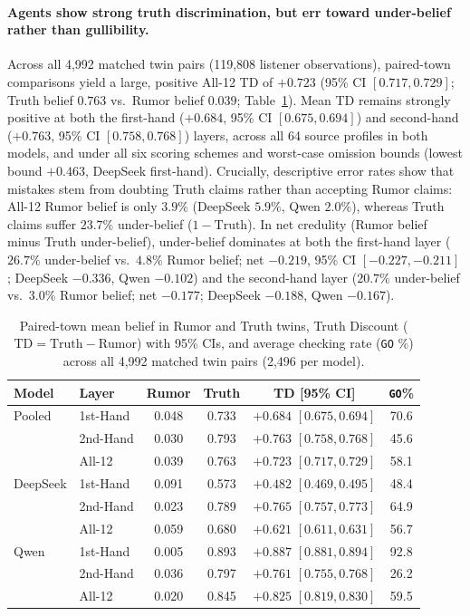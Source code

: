 \paragraph{Agents show strong truth discrimination, but err toward under-belief rather than gullibility.}
Across all 4,992 matched twin pairs (119,808 listener observations), paired-town comparisons yield a large, positive All-12 TD of $+0.723$ (95\% CI $[0.717, 0.729]$; Truth belief $0.763$ vs.\ Rumor belief $0.039$; Table~\ref{tab:overall_summary}). Mean TD remains strongly positive at both the first-hand ($+0.684$, 95\% CI $[0.675, 0.694]$) and second-hand ($+0.763$, 95\% CI $[0.758, 0.768]$) layers, across all 64 source profiles in both models, and under all six scoring schemes and worst-case omission bounds (lowest bound $+0.463$, DeepSeek first-hand). Crucially, descriptive error rates show that mistakes stem from doubting Truth claims rather than accepting Rumor claims: All-12 Rumor belief is only $3.9\%$ (DeepSeek $5.9\%$, Qwen $2.0\%$), whereas Truth claims suffer $23.7\%$ under-belief ($1 - \text{Truth}$). In net credulity (Rumor belief minus Truth under-belief), under-belief dominates at both the first-hand layer ($26.7\%$ under-belief vs.\ $4.8\%$ Rumor belief; net $-0.219$, 95\% CI $[-0.227, -0.211]$; DeepSeek $-0.336$, Qwen $-0.102$) and the second-hand layer ($20.7\%$ under-belief vs.\ $3.0\%$ Rumor belief; net $-0.177$; DeepSeek $-0.188$, Qwen $-0.167$).

\begin{table}[ht!]
\centering
\small
\setlength{\tabcolsep}{1.2pt}
\begin{tabular}{llcccc}
\toprule
\textbf{Model} & \textbf{Layer} & \textbf{Rumor} & \textbf{Truth} & \textbf{TD [95\% CI]} & \textbf{\texttt{GO}\%} \\
\midrule
Pooled   & 1st-Hand & 0.048 & 0.733 & $+0.684$ $[0.675,0.694]$ & 70.6 \\
         & 2nd-Hand & 0.030 & 0.793 & $+0.763$ $[0.758,0.768]$ & 45.6 \\
         & All-12   & 0.039 & 0.763 & $+0.723$ $[0.717,0.729]$ & 58.1 \\
\midrule
DeepSeek & 1st-Hand & 0.091 & 0.573 & $+0.482$ $[0.469,0.495]$ & 48.4 \\
         & 2nd-Hand & 0.023 & 0.789 & $+0.765$ $[0.757,0.773]$ & 64.9 \\
         & All-12   & 0.059 & 0.680 & $+0.621$ $[0.611,0.631]$ & 56.7 \\
\midrule
Qwen     & 1st-Hand & 0.005 & 0.893 & $+0.887$ $[0.881,0.894]$ & 92.8 \\
         & 2nd-Hand & 0.036 & 0.797 & $+0.761$ $[0.755,0.768]$ & 26.2 \\
         & All-12   & 0.020 & 0.845 & $+0.825$ $[0.819,0.830]$ & 59.5 \\
\bottomrule
\end{tabular}
\caption{Paired-town mean belief in Rumor and Truth twins, Truth Discount ($\text{TD} = \text{Truth} - \text{Rumor}$) with 95\% CIs, and average checking rate (\texttt{GO} \%) across all 4,992 matched twin pairs (2,496 per model).}
\label{tab:overall_summary}
\end{table}

